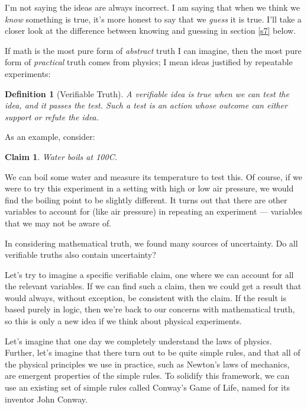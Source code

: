 \documentclass[9pt, twoside]{book}
\newtheorem*{defn}{Definition}
\newtheorem*{claim}{Claim}
\theoremstyle{argtstyle}
\begin{document}
I'm not saying the ideas are always incorrect. I am saying that when we think we
{\em know} something is true, it's more honest to say that we {\em guess} it is
true. I'll take a closer look at
the difference between knowing and guessing in section \ref{s7} below.

If math is the most pure form of {\em abstract} truth I can imagine, then the
most pure form of {\em practical} truth comes from physics; I mean ideas
justified by repeatable experiments:

\begin{defn}[Verifiable Truth]
    A verifiable idea is true when we can test the idea, and it passes
    the test. Such a test is an action whose outcome
    can either support or refute the idea.
\end{defn}

As an example, consider:
\begin{claim}
    Water boils at 100\/\degree C.
\end{claim}
We can boil some water and measure its temperature to test this.
Of course,
if we were to try this experiment in a setting with high or low air pressure, we
would find the boiling point to be slightly different.
It turns out that
there are other variables to account for (like air pressure)
in repeating an experiment ---
variables that we may not be aware of.

In considering mathematical truth, we found many sources of uncertainty.
Do all verifiable truths also contain uncertainty?

Let's try to imagine a specific verifiable claim, one where we can
account for all the relevant variables. If we can find such a claim, then we
could get a result that would always, without exception, be
consistent with the claim.
If the result is based purely in logic, then we're
back to our concerns with mathematical truth, so this is only a new idea if we
think about physical experiments.

Let's imagine that one day we completely understand the laws of physics.
Further, let's imagine that there turn out to be quite simple rules, and that
all of the physical principles we use in practice, such as Newton's laws of
mechanics, are emergent properties of the simple rules.
To solidify this framework, we can use an existing set of simple rules
called Conway's Game of Life, named for its inventor John Conway.
\end{document}
